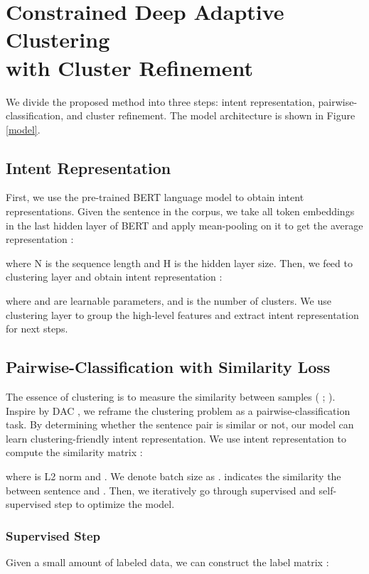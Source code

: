 \documentclass[letterpaper]{article} \usepackage{aaai20}  \usepackage{times}  \usepackage{helvet} \usepackage{courier}  \usepackage[hyphens]{url}  \usepackage{graphicx} \urlstyle{rm} \def\UrlFont{\rm}  \usepackage{graphicx}  \frenchspacing  \setlength{\pdfpagewidth}{8.5in}  \setlength{\pdfpageheight}{11in}
\begin{document}
\section{Constrained Deep Adaptive Clustering \\ with Cluster Refinement}
We divide the proposed method into three steps: intent representation, pairwise-classification, and cluster refinement. The model architecture is shown in Figure \ref{model}.
\subsection{Intent Representation}
First, we use the pre-trained BERT language model to obtain intent representations. Given the  sentence  in the corpus, we take all token embeddings  in the last hidden layer of BERT and apply mean-pooling on it to get the average representation :

where N is the sequence length and H is the hidden layer size. Then, we feed  to clustering layer  and obtain intent representation :

where  and   are learnable parameters, and  is the number of clusters. We use clustering layer to group the high-level features and extract intent representation  for next steps.

\subsection{Pairwise-Classification with Similarity Loss}
The essence of clustering is to measure the similarity between samples (\citeauthor{haponchyk2018supervised} \citeyear{haponchyk2018supervised}; \citeauthor{poddar2019train} \citeyear{poddar2019train}). Inspire by DAC \cite{chang2017deep}, we reframe the clustering problem as a pairwise-classification task. By determining whether the sentence pair is similar or not, our model can learn clustering-friendly intent representation. We use intent representation  to compute the similarity matrix :

where  is L2 norm and . We denote batch size as .  indicates the similarity the between sentence  and . Then, we iteratively go through supervised and self-supervised step to optimize the model.

\subsubsection{Supervised Step} Given a small amount of labeled data, we can construct the label matrix :
\end{document}

